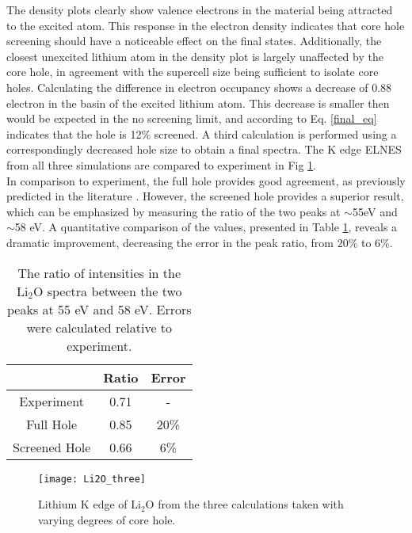 The density plots clearly show valence electrons in the material being attracted to the excited atom. This response in the electron density indicates that core hole screening should have a noticeable effect on the final states.  Additionally, the closest unexcited lithium atom in the density plot is largely unaffected by the core hole, in agreement with the supercell size being sufficient to isolate core holes.  Calculating the difference in electron occupancy shows a decrease of 0.88 electron in the basin of the excited lithium atom.  This decrease is smaller then would be expected in the no screening limit, and according to Eq. \ref{final_eq} indicates that the hole is 12\% screened.  A third calculation is performed using a correspondingly decreased hole size to obtain a final spectra.  The K edge ELNES from all three simulations are compared to experiment in Fig \ref{Li2O_three}.  \\

In comparison to experiment, the full hole provides good agreement, as previously predicted in the literature \cite{mauchamp_ab_2006}. However, the screened hole provides a superior result, which can be emphasized by measuring the ratio of the two peaks at $\sim$55eV and $\sim$58 eV.  A quantitative comparison of the values, presented in Table \ref{ratio}, reveals a dramatic improvement, decreasing the error in the peak ratio, from 20\% to  6\%.  

\begin{table}[H]
	\centering
		\caption{The ratio of intensities in the $\mathrm{Li_2O}$ spectra between the two peaks at 55 eV and 58 eV.  Errors were calculated relative to experiment.   }
	
	\begin{tabular}{ccc}
		& Ratio & Error \\
		\hline
		Experiment & 0.71 & -  \\
		Full Hole & 0.85 & 20\%  \\
		Screened Hole & 0.66 & 6\%  \\
		
	\end{tabular}
\label{ratio}
\end{table}




\begin{figure}
	\centering
	\texttt{[image: Li2O\_three]}
	\caption{Lithium K edge of $ \mathrm{Li_2O} $ from the three calculations taken with varying degrees of core hole. }
	\label{Li2O_three}
\end{figure}

